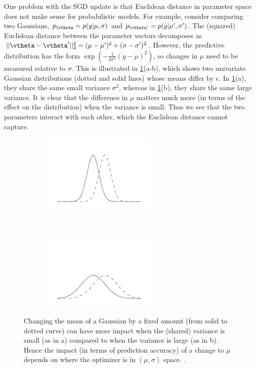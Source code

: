 One problem with the SGD update is that Euclidean distance
in parameter space does not make sense for probabilistic models.
For example, consider
comparing two Gaussians,
$p_{\vtheta} = p(y|\mu,\sigma)$
and
$p_{\vtheta'} = p(y|\mu',\sigma')$.
The (squared) Euclidean distance between the parameter vectors
decomposes as $||\vtheta - \vtheta'||_2^2 = (\mu-\mu')^2 + (\sigma-\sigma')^2$.
However, the predictive distribution has the form
$\exp(-\frac{1}{2\sigma^2} (y-\mu)^2)$,
so changes in $\mu$ need to be measured
relative to $\sigma$.
This is illustrated in 
\cref{fig:honkelaGaussians}(a-b),
which shows
two univariate Gaussian distributions (dotted and solid lines)
whose means differ  by $\epsilon$.
In \cref{fig:honkelaGaussians}(a), they share the same small variance
$\sigma^2$,
whereas in  \cref{fig:honkelaGaussians}(b), they share the same large variance.
It is clear that the difference in   $\mu$
matters much more (in terms of the effect on the distribution)
when the variance is small.
Thus we see that the two parameters interact with each other,
which the Euclidean distance cannot capture.

\begin{figure}
\centering
\begin{subfigure}[b]{0.45\textwidth}
\centering
\includegraphics[height=1.5in]{figs/meanchange_lowvar}
\caption{ }
\end{subfigure}
~
\begin{subfigure}[b]{0.45\textwidth}
\centering
\includegraphics[height=1.5in]{figs/meanchange_highvar}
\caption{ }
\end{subfigure}
\caption{
 Changing the mean of a Gaussian by a fixed amount (from solid to
 dotted curve)
can have more impact
when the (shared) variance is small (as in a)
compared to when the variance is large (as in b).
Hence the impact (in terms of prediction accuracy)
of a change to $\mu$
depends on where the optimizer is in
$(\mu,\sigma)$ space.
.
}
\label{fig:honkelaGaussians}
\end{figure}

